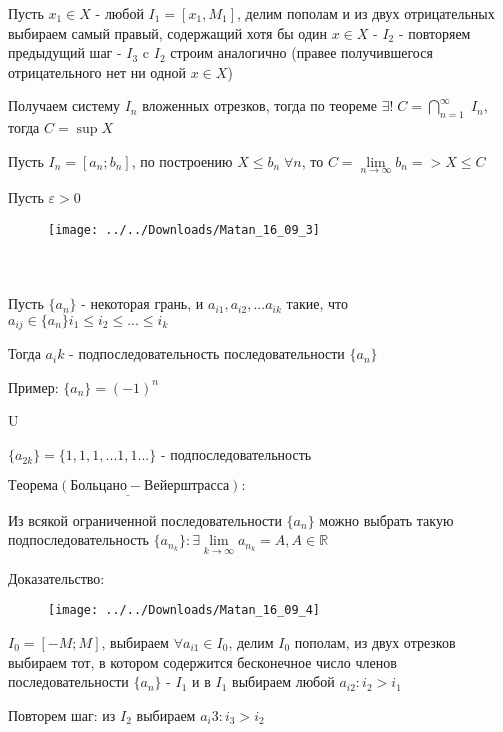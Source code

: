 \documentclass[14pt,a4paper]{article}
\begin{document}
Пусть $x_1 \in X$ - любой $I_1 = [x_1, M_1]$, делим пополам  и из двух отрицательных выбираем самый правый, содержащий хотя бы один $x \in X$ - $I_2$ - повторяем предыдущий шаг - $I_3$ c $I_2$ строим аналогично (правее получившегося отрицательного нет ни одной $ x \in X$)

Получаем систему $I_n$ вложенных отрезков, тогда по теореме $ \exists! \; C = \bigcap\limits^{\infty}_{n = 1} \; I_n $, тогда $C = \sup X$

Пусть $I_n = [a_n;b_n]$, по построению  $X\le b_n \; \forall n$, то $C = \lim\limits_{n \rightarrow \infty} b_n => X\le C$

Пусть $\varepsilon > 0 $

\begin{figure}[h]
	\centering
	\texttt{[image: ../../Downloads/Matan\_16\_09\_3]}
\end{figure}

$ $

$ $

$ $

Пусть $\{a_n\}$ - некоторая грань, и $a_{i1}, a_{i2},... a_{ik}$ такие, что $a_{ij} \in \{a_n\} i_1\le i_2 \le ... \le i_k$

Тогда $a_ik $ - подпоследовательность последовательности $\{ a_n\} $

Пример: $\{ a_n \} = (-1)^n $

\quad\quad\quad\quad\quad U

\quad\quad\quad\quad $ \{ a_{2k}\} = \{ 1, 1, 1, ... 1, 1 ... \} $ - подпоследовательность

$\underline{Теорема ( Больцано - Вейерштрасса):}$

Из всякой ограниченной последовательности  $\{ a_n \}$ можно выбрать такую подпоследовательность $ \{ a_{n_{k}} \} : \exists \lim\limits_{k \rightarrow \infty} a_{n_{k}} = A, A \in \mathbb{R}$

Доказательство:

\begin{figure}[h]
	\centering
	\texttt{[image: ../../Downloads/Matan\_16\_09\_4]}
\end{figure}

$I_0 = [-M; M]$, выбираем $\forall a_{i1} \in I_0$, делим $I_0$ пополам, из двух отрезков выбираем тот, в котором содержится бесконечное число членов последовательности $\{a_n\}$ - $I_1$ и в $I_1$ выбираем любой $a_{i2} : i_2 > i_1$

Повторем шаг: из $I_2$  выбираем $a_i3 : i_3 > i_2$
\end{document}
